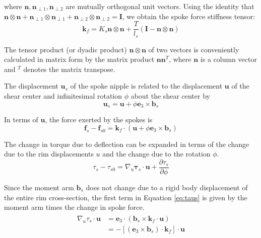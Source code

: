 \documentclass[../thesis.tex]{subfiles}
\newcommand{\eh}{\mathbf{e}_3}
\newcommand{\n}{\mathbf{n}}
\newcommand{\npo}{\mathbf{n}_{\perp 1}}
\newcommand{\npt}{\mathbf{n}_{\perp 2}}
\newcommand{\bs}{\mathbf{b}_s}
\begin{document}
where $\n,\npo,\npt$ are mutually orthogonal unit vectors. Using the identity that $\n\otimes\n + \npo\otimes\npo + \npt\otimes\npt = \mathbf{I}$, we obtain the spoke force stiffness tensor:
\begin{equation}
\label{eq:kf}
\mathbf{k}_f = K_s \n\otimes\n + \frac{T}{l_s}(\mathbf{I} - \n\otimes\n)
\end{equation}

The tensor product (or dyadic product) $\n\otimes\n$ of two vectors is conveniently calculated in matrix form by the matrix product $\n\n^T$, where $\n$ is a column vector  and $^T$ denotes the matrix transpose.

The displacement $\mathbf{u}_s$ of the spoke nipple is related to the displacement $\mathbf{u}$ of the shear center and infinitesimal rotation $\phi$ about the shear center by
\begin{equation}
\label{eq:u_s}
\mathbf{u}_s = \mathbf{u} + \phi\eh \times \bs
\end{equation}

In terms of $\mathbf{u}$, the force exerted by the spokes is
\begin{equation}
\label{eq:fs_u}
\mathbf{f}_s - \mathbf{f}_{s0} = \mathbf{k}_f \cdot (\mathbf{u} + \phi\eh\times\bs)
\end{equation}

The change in torque due to deflection can be expanded in terms of the change due to the rim displacements $u$ and the change due to the rotation $\phi$.
\begin{equation}
\label{eq:taus}
\tau_s - \tau_{s0} = \nabla_u\mathbf{\tau}_s\cdot\mathbf{u} +
    \frac{\partial\tau_s}{\partial\phi}
\end{equation}

Since the moment arm $\bs$ does not change due to a rigid body displacement of the entire rim cross-section, the first term in Equation \eqref{eq:taus} is given by the moment arm times the change in spoke force.
\begin{align}
\label{eq:taus_del}
\begin{split}
\nabla_u\tau_s\cdot\mathbf{u} &= \eh\cdot (\bs\times\mathbf{k}_f\cdot\mathbf{u})\\
    &= -[(\eh\times\bs)\cdot\mathbf{k}_f]\cdot\mathbf{u}
\end{split}
\end{align}
\end{document}
